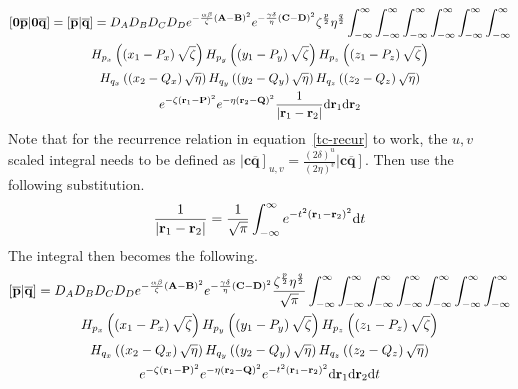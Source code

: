 \begin{multline}
  \left[\mathbf{0}\overline{\mathbf{p}}\middle|\mathbf{0}\overline{\mathbf{q}}\right] = \left[\overline{\mathbf{p}}\middle|\overline{\mathbf{q}}\right] = D_A D_B D_C D_D e^{-\frac{\alpha\beta}{\zeta}\left(\mathbf{A} - \mathbf{B}\right)^2}e^{-\frac{\gamma\delta}{\eta}\left(\mathbf{C} - \mathbf{D}\right)^2} \zeta^{\frac{p}{2}}\eta^{\frac{q}{2}}\int_{-\infty}^\infty\int_{-\infty}^\infty\int_{-\infty}^\infty\int_{-\infty}^\infty\int_{-\infty}^\infty\int_{-\infty}^\infty \\
  H_{p_x}\left(\left(x_1 - P_x\right)\sqrt{\zeta}\right)H_{p_y}\left(\left(y_1 - P_y\right)\sqrt{\zeta}\right)H_{p_z}\left(\left(z_1 - P_z\right)\sqrt{\zeta}\right)\\
  H_{q_x}\left(\left(x_2 - Q_x\right)\sqrt{\eta}\right)H_{q_y}\left(\left(y_2 - Q_y\right)\sqrt{\eta}\right)H_{q_z}\left(\left(z_2 - Q_z\right)\sqrt{\eta}\right) \\
  e^{-\zeta\left(\mathbf{r}_1 - \mathbf{P}\right)^2} e^{-\eta\left(\mathbf{r}_2 - \mathbf{Q}\right)^2} \frac{1}{\left|\mathbf{r}_1 - \mathbf{r}_2\right|} \mathrm{d}\mathbf{r}_1 \mathrm{d}\mathbf{r}_2
\end{multline}
Note that for the recurrence relation in equation~\ref{tc-recur} to work, the $u,v$ scaled integral needs to be defined as $\left|\mathbf{c}\overline{\mathbf{q}}\right]_{u,v} = \frac{\left(2\delta\right)^u}{\left(2\eta\right)^v}\left|\mathbf{c}\overline{\mathbf{q}}\right]$. Then use the following substitution.
\begin{equation}
  \frac{1}{\left|\mathbf{r}_1 - \mathbf{r}_2\right|} = \frac{1}{\sqrt{\pi}}\int_{-\infty}^\infty e^{-t^2\left(\mathbf{r}_1 - \mathbf{r}_2\right)^2} \mathrm{d} t
  \label{jesus-kernel}
\end{equation}
The integral then becomes the following.
\begin{multline}
  \left[\overline{\mathbf{p}}\middle|\overline{\mathbf{q}}\right] = D_A D_B D_C D_D e^{-\frac{\alpha\beta}{\zeta}\left(\mathbf{A} - \mathbf{B}\right)^2}e^{-\frac{\gamma\delta}{\eta}\left(\mathbf{C} - \mathbf{D}\right)^2}\frac{\zeta^{\frac{p}{2}}\eta^{\frac{q}{2}}}{\sqrt{\pi}} \int_{-\infty}^\infty\int_{-\infty}^\infty\int_{-\infty}^\infty\int_{-\infty}^\infty\int_{-\infty}^\infty\int_{-\infty}^\infty \int_{-\infty}^\infty\\
  H_{p_x}\left(\left(x_1 - P_x\right)\sqrt{\zeta}\right)H_{p_y}\left(\left(y_1 - P_y\right)\sqrt{\zeta}\right)H_{p_z}\left(\left(z_1 - P_z\right)\sqrt{\zeta}\right)\\
  H_{q_x}\left(\left(x_2 - Q_x\right)\sqrt{\eta}\right)H_{q_y}\left(\left(y_2 - Q_y\right)\sqrt{\eta}\right)H_{q_z}\left(\left(z_2 - Q_z\right)\sqrt{\eta}\right) \\
  e^{-\zeta\left(\mathbf{r}_1 - \mathbf{P}\right)^2} e^{-\eta\left(\mathbf{r}_2 - \mathbf{Q}\right)^2} e^{-t^2 \left(\mathbf{r}_1 - \mathbf{r}_2\right)^2} \mathrm{d}\mathbf{r}_1 \mathrm{d}\mathbf{r}_2 \mathrm{d} t
\end{multline}
